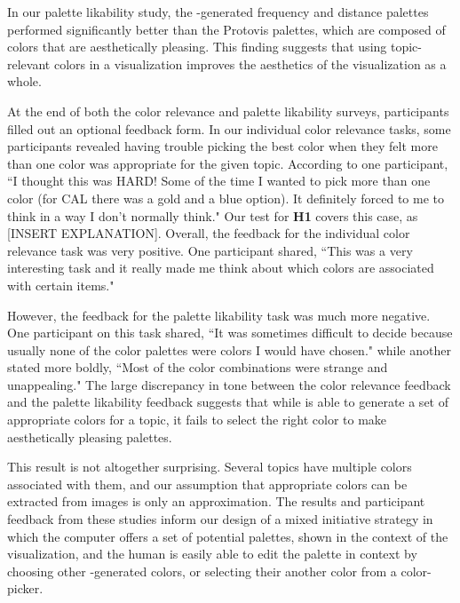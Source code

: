 In our palette likability study, the \system-generated frequency and distance palettes performed significantly better than the Protovis palettes, which are composed of colors that are aesthetically pleasing. This finding suggests that using topic-relevant colors in a visualization improves the aesthetics of the visualization as a whole. 

At the end of both the color relevance and palette likability surveys, participants filled out an optional feedback form. In our individual color relevance tasks, some participants revealed having trouble picking the best color when they felt more than one color was appropriate for the given topic. According to one participant, ``I thought this was HARD! Some of the time I wanted to pick more than one color (for CAL there was a gold and a blue option). It definitely forced to me to think in a way I don't normally think." Our test for \textbf{H1} covers this case, as [INSERT EXPLANATION]. Overall, the feedback for the individual color relevance task was very positive. One participant shared, ``This was a very interesting task and it really made me think about which colors are associated with certain items."

However, the feedback for the palette likability task was much more negative. One participant on this task shared, ``It was sometimes difficult to decide because usually none of the color palettes were colors I would have chosen." while another stated more boldly, ``Most of the color combinations were strange and unappealing." The large discrepancy in tone between the color relevance feedback and the palette likability feedback suggests that while \system is able to generate a set of appropriate colors for a topic, it fails to select the right color to make aesthetically pleasing palettes. 

This result is not altogether surprising. Several topics have multiple colors associated with them, and our assumption that appropriate colors can be extracted from images is only an approximation. The results and participant feedback from these studies inform our design of a mixed initiative strategy in which the computer offers a set of potential palettes, shown in the context of the visualization, and the human is easily able to edit the palette in context by choosing other \system-generated colors, or selecting their another color from a color-picker. 